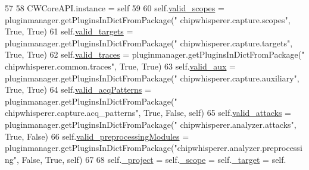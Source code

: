 \begin{DoxyCode}
57 
58         CWCoreAPI.instance = self
59 
60         self.\hyperlink{classsoftware_1_1chipwhisperer_1_1common_1_1api_1_1CWCoreAPI_1_1CWCoreAPI_a47de68f297ec2b2658e2cf2dc275aa5c}{valid\_scopes} = pluginmanager.getPluginsInDictFromPackage(\textcolor{stringliteral}{"
      chipwhisperer.capture.scopes"}, \textcolor{keyword}{True}, \textcolor{keyword}{True})
61         self.\hyperlink{classsoftware_1_1chipwhisperer_1_1common_1_1api_1_1CWCoreAPI_1_1CWCoreAPI_afcb6d99e8d1148efc6a5b89aeafa3910}{valid\_targets} =  pluginmanager.getPluginsInDictFromPackage(\textcolor{stringliteral}{"
      chipwhisperer.capture.targets"}, \textcolor{keyword}{True}, \textcolor{keyword}{True})
62         self.\hyperlink{classsoftware_1_1chipwhisperer_1_1common_1_1api_1_1CWCoreAPI_1_1CWCoreAPI_a9b826e94323e65d1d9731dc1231d69f9}{valid\_traces} = pluginmanager.getPluginsInDictFromPackage(\textcolor{stringliteral}{"
      chipwhisperer.common.traces"}, \textcolor{keyword}{True}, \textcolor{keyword}{True})
63         self.\hyperlink{classsoftware_1_1chipwhisperer_1_1common_1_1api_1_1CWCoreAPI_1_1CWCoreAPI_a57810bcd4b0a8381b954c740d336ddd8}{valid\_aux} = pluginmanager.getPluginsInDictFromPackage(\textcolor{stringliteral}{"
      chipwhisperer.capture.auxiliary"}, \textcolor{keyword}{True}, \textcolor{keyword}{True})
64         self.\hyperlink{classsoftware_1_1chipwhisperer_1_1common_1_1api_1_1CWCoreAPI_1_1CWCoreAPI_a49e09806bba516fe7d7e77f1167f70a4}{valid\_acqPatterns} =  pluginmanager.getPluginsInDictFromPackage(\textcolor{stringliteral}{"
      chipwhisperer.capture.acq\_patterns"}, \textcolor{keyword}{True}, \textcolor{keyword}{False}, self)
65         self.\hyperlink{classsoftware_1_1chipwhisperer_1_1common_1_1api_1_1CWCoreAPI_1_1CWCoreAPI_adabf27b80db9295f37b360d4d2cf200e}{valid\_attacks} = pluginmanager.getPluginsInDictFromPackage(\textcolor{stringliteral}{"
      chipwhisperer.analyzer.attacks"}, \textcolor{keyword}{True}, \textcolor{keyword}{False})
66         self.\hyperlink{classsoftware_1_1chipwhisperer_1_1common_1_1api_1_1CWCoreAPI_1_1CWCoreAPI_a7f1d23219a0e6e4add061805952fe391}{valid\_preprocessingModules} = 
      pluginmanager.getPluginsInDictFromPackage(\textcolor{stringliteral}{"chipwhisperer.analyzer.preprocessing"}, \textcolor{keyword}{False}, \textcolor{keyword}{True}, self)
67 
68         self.\hyperlink{classsoftware_1_1chipwhisperer_1_1common_1_1api_1_1CWCoreAPI_1_1CWCoreAPI_a27d9dc191219c9c587b9bbde876122d9}{\_project} = self.\hyperlink{classsoftware_1_1chipwhisperer_1_1common_1_1api_1_1CWCoreAPI_1_1CWCoreAPI_aa03df2b9eee5657de4d91b24eff64e44}{\_scope} = self.\hyperlink{classsoftware_1_1chipwhisperer_1_1common_1_1api_1_1CWCoreAPI_1_1CWCoreAPI_ad929648918f30ccf17fc56e3dab8589b}{\_target} = self.

\end{DoxyCode}
